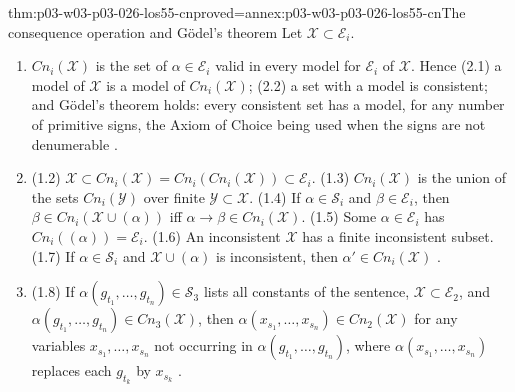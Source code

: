 \begin{hblemma}{thm:p03-w03-p03-026-los55-cn}{proved=annex:p03-w03-p03-026-los55-cn}{The consequence operation and G\"odel's theorem}
Let \(\mathcal X\subset\mathcal E_i\).
\begin{enumerate}
 \item \(\mathit{Cn}_i(\mathcal X)\) is the set of \(\alpha\in\mathcal E_i\)
       valid in every model for \(\mathcal E_i\) of \(\mathcal X\).  Hence
       (2.1) a model of \(\mathcal X\) is a model of
       \(\mathit{Cn}_i(\mathcal X)\); (2.2) a set with a model is consistent;
       and G\"odel's theorem holds: every consistent set has a model, for
       any number of primitive signs, the Axiom of Choice being used when
       the signs are not denumerable \cite[p.~42]{Los1955}.
 \item (1.2) \(\mathcal X\subset\mathit{Cn}_i(\mathcal X)=\mathit{Cn}_i(\mathit{Cn}_i(\mathcal X))\subset\mathcal E_i\).
       (1.3) \(\mathit{Cn}_i(\mathcal X)\) is the union of the sets
       \(\mathit{Cn}_i(\mathcal Y)\) over finite \(\mathcal Y\subset\mathcal X\).
       (1.4) If \(\alpha\in\mathcal S_i\) and \(\beta\in\mathcal E_i\), then
       \(\beta\in\mathit{Cn}_i(\mathcal X\cup(\alpha))\) iff
       \(\alpha\to\beta\in\mathit{Cn}_i(\mathcal X)\).
       (1.5) Some \(\alpha\in\mathcal E_i\) has
       \(\mathit{Cn}_i((\alpha))=\mathcal E_i\).
       (1.6) An inconsistent \(\mathcal X\) has a finite inconsistent subset.
       (1.7) If \(\alpha\in\mathcal S_i\) and \(\mathcal X\cup(\alpha)\) is
       inconsistent, then \(\alpha'\in\mathit{Cn}_i(\mathcal X)\)
       \cite[pp.~40--41]{Los1955}.
 \item (1.8) If \(\alpha(g_{t_1},\ldots,g_{t_n})\in\mathcal S_3\) lists all
       constants of the sentence, \(\mathcal X\subset\mathcal E_2\), and
       \(\alpha(g_{t_1},\ldots,g_{t_n})\in\mathit{Cn}_3(\mathcal X)\), then
       \(\alpha(x_{s_1},\ldots,x_{s_n})\in\mathit{Cn}_2(\mathcal X)\) for
       any variables \(x_{s_1},\ldots,x_{s_n}\) not occurring in
       \(\alpha(g_{t_1},\ldots,g_{t_n})\), where
       \(\alpha(x_{s_1},\ldots,x_{s_n})\) replaces each \(g_{t_k}\) by
       \(x_{s_k}\) \cite[p.~41]{Los1955}.
\end{enumerate}
\end{hblemma}

